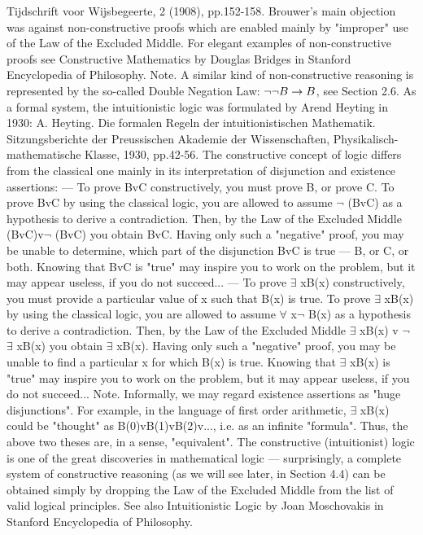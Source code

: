 Tijdschrift voor Wijsbegeerte, 2 (1908), pp.152-158.
Brouwer's main objection was against non-constructive proofs which are enabled mainly by "improper"
use of the Law of the Excluded Middle.
For elegant examples of non-constructive proofs see Constructive Mathematics by Douglas Bridges in
Stanford Encyclopedia of Philosophy.
Note. A similar kind of non-constructive reasoning is represented by the so-called Double Negation Law:
\(\neg \neg B\rightarrow B\), see Section 2.6.
As a formal system, the intuitionistic logic was formulated by Arend Heyting in 1930:
A. Heyting. Die formalen Regeln der intuitionistischen Mathematik. Sitzungsberichte der Preussischen Akademie der
Wissenschaften, Physikalisch-mathematische Klasse, 1930, pp.42-56.
The constructive concept of logic differs from the classical one mainly in its interpretation of disjunction
and existence assertions:
--- To prove BvC constructively, you must prove B, or prove C. To prove BvC by using the classical logic,
you are allowed to assume \(\neg\) (BvC) as a hypothesis to derive a contradiction. Then, by the Law of the
Excluded Middle (BvC)v\(\neg\) (BvC) you obtain BvC. Having only such a "negative" proof, you may be
unable to determine, which part of the disjunction BvC is true --- B, or C, or both. Knowing that BvC is
"true" may inspire you to work on the problem, but it may appear useless, if you do not succeed...
--- To prove \(\exists\) xB(x) constructively, you must provide a particular value of x such that B(x) is true. To
prove \(\exists\) xB(x) by using the classical logic, you are allowed to assume \(\forall\) x\(\neg\) B(x) as a hypothesis to derive a
contradiction. Then, by the Law of the Excluded Middle \(\exists\) xB(x) v \(\neg\) \(\exists\) xB(x) you obtain \(\exists\) xB(x). Having
only such a "negative" proof, you may be unable to find a particular x for which B(x) is true. Knowing
that \(\exists\) xB(x) is "true" may inspire you to work on the problem, but it may appear useless, if you do not
succeed...
Note. Informally, we may regard existence assertions as "huge disjunctions". For example, in the
language of first order arithmetic, \(\exists\) xB(x) could be "thought" as B(0)vB(1)vB(2)v..., i.e. as an infinite
"formula". Thus, the above two theses are, in a sense, "equivalent".
The constructive (intuitionist) logic is one of the great discoveries in mathematical logic --- surprisingly, a
complete system of constructive reasoning (as we will see later, in Section 4.4) can be obtained simply by
dropping the Law of the Excluded Middle from the list of valid logical principles.
See also Intuitionistic Logic by Joan Moschovakis in Stanford Encyclopedia of Philosophy.
